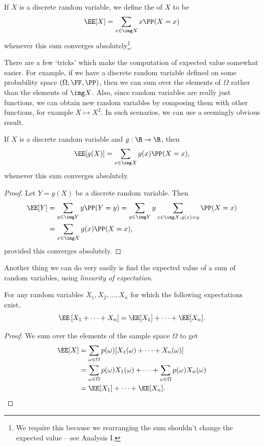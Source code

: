 \begin{definition}
	If $X$ is a discrete random variable, we define the  of $X$ to be
	$$
\EE[X] = \sum_{x \in \img X} x \PP(X = x)
	$$
	whenever this sum converges absolutely\footnote{We require this because we rearranging the sum shouldn't change the expected value -- see Analysis I.}.
\end{definition}

There are a few `tricks' which make the computation of expected value somewhat easier. For example, if we have a discrete random variable defined on some probability space $(\Omega, \FF, \PP)$, then we can sum over the elements of $\Omega$ rather than the elements of $\img X$.
Also, since random variables are really just functions, we can obtain new random variables by composing them with other functions, for example $X \mapsto X^2$. In such scenarios, we can use a seemingly obvious result.

\begin{theorem}
	If $X$ is a discrete random variable and $g: \R \rightarrow \R$, then
	$$
\EE[g(X)] = \sum_{x \in \img X} g(x) \PP(X = x),
	$$
	whenever this sum converges absolutely.
\end{theorem}
\begin{proof}
	Let $Y = g(X)$ be a discrete random variable. Then
	\begin{align*}
		\EE[Y] &= \sum_{y \in \img Y} y \PP(Y = y) = \sum_{y \in \img Y} y \sum_{x \in \img X : g(x) = y} \PP(X = x)  \\
		&= \sum_{x \in \img X} g(x) \PP(X = x),
	\end{align*}
	provided this converges absolutely.
\end{proof}

Another thing we can do very easily is find the expected value of a sum of random variables, using \emph{linearity of expectation}.

\begin{theorem}
	For any random variables $X_1, X_2, \dots, X_n$ for which the following expectations exist,
	$$
\EE\left[X_1 + \cdots + X_n\right]= \EE[X_1] + \cdots + \EE[X_n].
	$$
\end{theorem}
\begin{proof}
	We sum over the elements of the sample space $\Omega$ to get
	\begin{align*}
		\EE[X] &= \sum_{\omega \in \Omega} p(\omega)[X_1(\omega) + \cdots + X_n(\omega)]\\
		&= \sum_{\omega \in \Omega} p(\omega) X_1(\omega) + \cdots + \sum_{\omega \in \Omega} p(\omega) X_n(\omega)\\&= \EE[X_1] + \cdots + \EE[X_n].
	\end{align*}
\end{proof}

